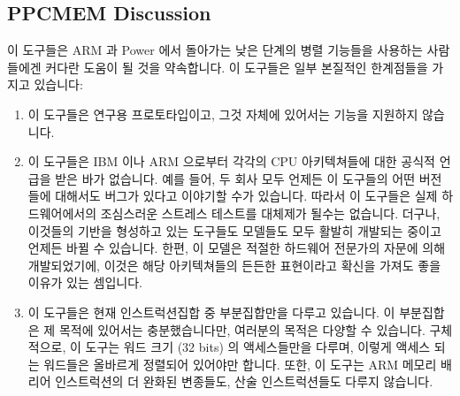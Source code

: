 \subsection{PPCMEM Discussion}
\label{sec:formal:PPCMEM Discussion}

이 도구들은 ARM 과 Power 에서 돌아가는 낮은 단계의 병렬 기능들을 사용하는
사람들에겐 커다란 도움이 될 것을 약속합니다.
이 도구들은 일부 본질적인 한계점들을 가지고 있습니다:
\iffalse

These tools promise to be of great help to people working on low-level
parallel primitives that run on ARM and on Power. These tools do have
some intrinsic limitations:
\fi

\begin{enumerate}
\item	이 도구들은 연구용 프로토타입이고, 그것 자체에 있어서는 기능을 지원하지
	않습니다.
\item	이 도구들은 IBM 이나 ARM 으로부터 각각의 CPU 아키텍쳐들에 대한 공식적
	언급을 받은 바가 없습니다.
	예를 들어, 두 회사 모두 언제든 이 도구들의 어떤 버전들에 대해서도
	버그가 있다고 이야기할 수가 있습니다.
	따라서 이 도구들은 실제 하드웨어에서의 조심스러운 스트레스 테스트를
	대체제가 될수는 없습니다.
	더구나, 이것들의 기반을 형성하고 있는 도구들도 모델들도 모두 활발히
	개발되는 중이고 언제든 바뀔 수 있습니다.
	한편, 이 모델은 적절한 하드웨어 전문가의 자문에 의해 개발되었기에,
	이것은 해당 아키텍쳐들의 든든한 표현이라고 확신을 가져도 좋을 이유가
	있는 셈입니다.
\item	이 도구들은 현재 인스트럭션집합 중 부분집합만을 다루고 있습니다.
	이 부분집합은 제 목적에 있어서는 충분했습니다만, 여러분의 목적은 다양할
	수 있습니다.
	구체적으로, 이 도구는 워드 크기 (32 bits) 의 액세스들만을 다루며,
	이렇게 액세스 되는 워드들은 올바르게 정렬되어 있어야만 합니다.
	또한, 이 도구는 ARM 메모리 배리어 인스트럭션의 더 완화된 변종들도, 산술
	인스트럭션들도 다루지 않습니다.
\iffalse


\end{enumerate}
